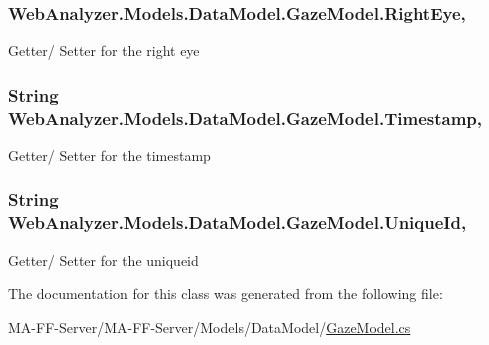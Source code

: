 \subsubsection[{Right\+Eye}]{ Web\+Analyzer.\+Models.\+Data\+Model.\+Gaze\+Model.\+Right\+Eye\hspace{0.3cm}{\ttfamily [get]}, {\ttfamily [set]}}\label{class_web_analyzer_1_1_models_1_1_data_model_1_1_gaze_model_a2303a593c1e6b377a480eb1903110452}


Getter/ Setter for the right eye 

\hypertarget{class_web_analyzer_1_1_models_1_1_data_model_1_1_gaze_model_af6b9cc989b7eefd89d4070d1683c8539}{}
\subsubsection[{Timestamp}]{\setlength{\rightskip}{0pt plus 5cm}String Web\+Analyzer.\+Models.\+Data\+Model.\+Gaze\+Model.\+Timestamp\hspace{0.3cm}{\ttfamily [get]}, {\ttfamily [set]}}\label{class_web_analyzer_1_1_models_1_1_data_model_1_1_gaze_model_af6b9cc989b7eefd89d4070d1683c8539}


Getter/ Setter for the timestamp 

\hypertarget{class_web_analyzer_1_1_models_1_1_data_model_1_1_gaze_model_a4fbd98b9986f70848075e65dec5fd8b4}{}
\subsubsection[{Unique\+Id}]{\setlength{\rightskip}{0pt plus 5cm}String Web\+Analyzer.\+Models.\+Data\+Model.\+Gaze\+Model.\+Unique\+Id\hspace{0.3cm}{\ttfamily [get]}, {\ttfamily [set]}}\label{class_web_analyzer_1_1_models_1_1_data_model_1_1_gaze_model_a4fbd98b9986f70848075e65dec5fd8b4}


Getter/ Setter for the uniqueid 



The documentation for this class was generated from the following file\+:\begin{DoxyCompactItemize}
\item 
M\+A-\/\+F\+F-\/\+Server/\+M\+A-\/\+F\+F-\/\+Server/\+Models/\+Data\+Model/\hyperlink{_gaze_model_8cs}{Gaze\+Model.\+cs}\end{DoxyCompactItemize}
